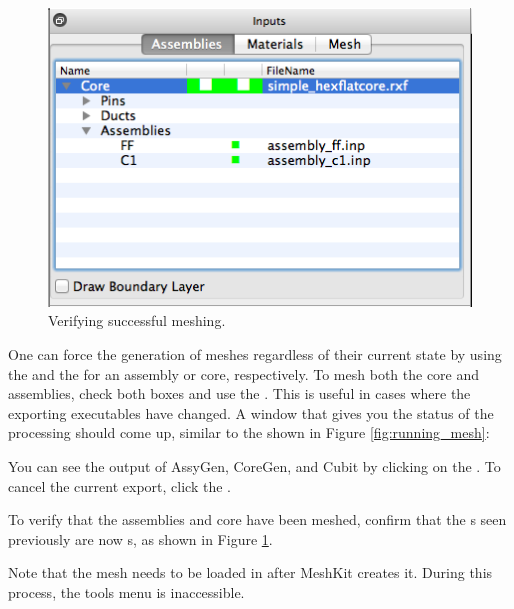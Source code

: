 \begin{figure}
	\vspace{-20pt}
	\begin{center}
		\includegraphics[width=0.95\linewidth]{Images/mesh-6.png}
		\caption{Verifying successful meshing.}
		\label{fig:final_verifiction}
	\end{center}
	\vspace{-10pt}
\end{figure}

One can force the generation of meshes regardless of their current state by using the  and the  for an assembly or core, respectively.  To mesh both the core and assemblies, check both boxes and use the .  This is useful in cases where the exporting executables have changed.  A window that gives you the status of the processing should come up, similar to the shown in Figure \ref{fig:running_mesh}:


You can see the output of AssyGen, CoreGen, and Cubit by clicking on the .  To cancel the current export, click the .

To verify that the assemblies and core have been meshed, confirm that the s seen previously are now s, as shown in Figure \ref{fig:final_verifiction}.

Note that the mesh needs to be loaded in after MeshKit creates it.  During this process, the tools menu is inaccessible.